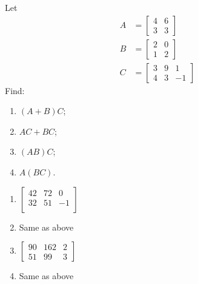 \begin{Exercise}
Let
\begin{align*}
A &=
\begin{bmatrix}
4 & 6\\
3 & 3
\end{bmatrix} \\
B &= 
\begin{bmatrix}
2 & 0\\
1 & 2
\end{bmatrix} \\
C &= 
\begin{bmatrix}
3 & 9 & 1\\
4 & 3 & -1
\end{bmatrix}
\end{align*}
Find:
\begin{enumerate}[label=(\alph*)]
\item $(A+B)C$;
\item $AC+BC$;
\item $(AB)C$;
\item $A(BC)$.
\end{enumerate}
\end{Exercise}
\begin{Answer}
\begin{enumerate}[label=(\alph*)]
\item $\begin{bmatrix}
42 & 72 & 0 \\ 
32 & 51 & -1 \\
\end{bmatrix}$
\item Same as above
\item $\begin{bmatrix}
90 & 162 & 2 \\
51 & 99 & 3
\end{bmatrix}$
\item Same as above
\end{enumerate}
\end{Answer}

